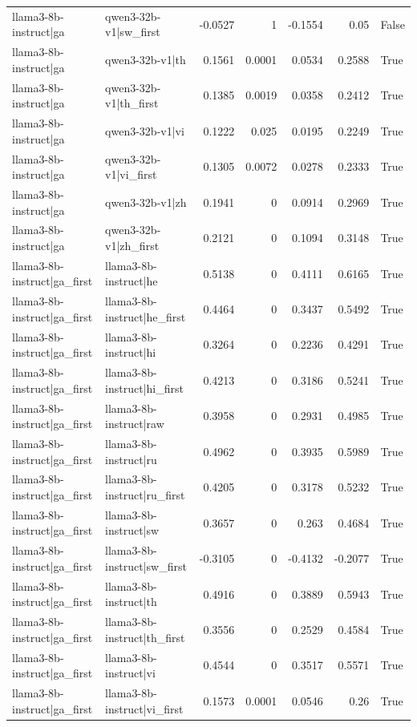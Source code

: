 \begin{table}
\begin{tabular}{l l r r r r l}
llama3-8b-instruct|ga & qwen3-32b-v1|sw_first & -0.0527 & 1 & -0.1554 & 0.05 & False \\
llama3-8b-instruct|ga & qwen3-32b-v1|th & 0.1561 & 0.0001 & 0.0534 & 0.2588 & True \\
llama3-8b-instruct|ga & qwen3-32b-v1|th_first & 0.1385 & 0.0019 & 0.0358 & 0.2412 & True \\
llama3-8b-instruct|ga & qwen3-32b-v1|vi & 0.1222 & 0.025 & 0.0195 & 0.2249 & True \\
llama3-8b-instruct|ga & qwen3-32b-v1|vi_first & 0.1305 & 0.0072 & 0.0278 & 0.2333 & True \\
llama3-8b-instruct|ga & qwen3-32b-v1|zh & 0.1941 & 0 & 0.0914 & 0.2969 & True \\
llama3-8b-instruct|ga & qwen3-32b-v1|zh_first & 0.2121 & 0 & 0.1094 & 0.3148 & True \\
llama3-8b-instruct|ga_first & llama3-8b-instruct|he & 0.5138 & 0 & 0.4111 & 0.6165 & True \\
llama3-8b-instruct|ga_first & llama3-8b-instruct|he_first & 0.4464 & 0 & 0.3437 & 0.5492 & True \\
llama3-8b-instruct|ga_first & llama3-8b-instruct|hi & 0.3264 & 0 & 0.2236 & 0.4291 & True \\
llama3-8b-instruct|ga_first & llama3-8b-instruct|hi_first & 0.4213 & 0 & 0.3186 & 0.5241 & True \\
llama3-8b-instruct|ga_first & llama3-8b-instruct|raw & 0.3958 & 0 & 0.2931 & 0.4985 & True \\
llama3-8b-instruct|ga_first & llama3-8b-instruct|ru & 0.4962 & 0 & 0.3935 & 0.5989 & True \\
llama3-8b-instruct|ga_first & llama3-8b-instruct|ru_first & 0.4205 & 0 & 0.3178 & 0.5232 & True \\
llama3-8b-instruct|ga_first & llama3-8b-instruct|sw & 0.3657 & 0 & 0.263 & 0.4684 & True \\
llama3-8b-instruct|ga_first & llama3-8b-instruct|sw_first & -0.3105 & 0 & -0.4132 & -0.2077 & True \\
llama3-8b-instruct|ga_first & llama3-8b-instruct|th & 0.4916 & 0 & 0.3889 & 0.5943 & True \\
llama3-8b-instruct|ga_first & llama3-8b-instruct|th_first & 0.3556 & 0 & 0.2529 & 0.4584 & True \\
llama3-8b-instruct|ga_first & llama3-8b-instruct|vi & 0.4544 & 0 & 0.3517 & 0.5571 & True \\
llama3-8b-instruct|ga_first & llama3-8b-instruct|vi_first & 0.1573 & 0.0001 & 0.0546 & 0.26 & True \\

\end{tabular}
\end{table}
